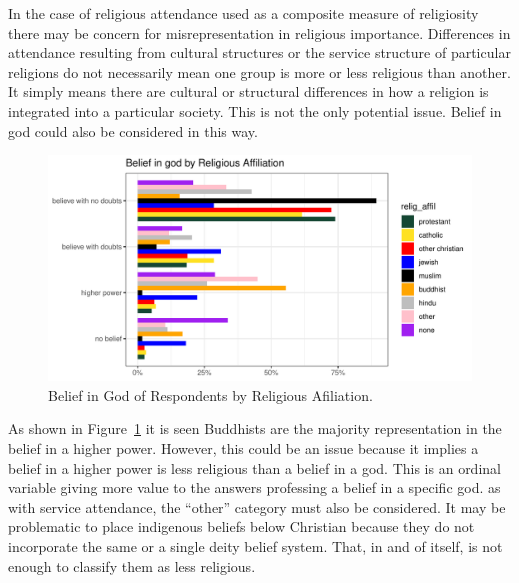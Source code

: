 \documentclass[
  12pt,
  letterpaper,
]{article}
\begin{document}
In the case of religious attendance used as a composite measure of
religiosity there may be concern for misrepresentation in religious
importance. Differences in attendance resulting from cultural structures
or the service structure of particular religions do not necessarily mean
one group is more or less religious than another. It simply means there
are cultural or structural differences in how a religion is integrated
into a particular society. This is not the only potential issue. Belief
in god could also be considered in this way.

\begin{figure}[!t]

{\centering \includegraphics{main_manuscript_files/figure-pdf/fig-Beleif_in_God_by_Religious_Affiliation-1.pdf}

}

\caption{\label{fig-Beleif_in_God_by_Religious_Affiliation}Belief in God
of Respondents by Religious Afiliation.}

\end{figure}

As shown in Figure~\ref{fig-Beleif_in_God_by_Religious_Affiliation} it
is seen Buddhists are the majority representation in the belief in a
higher power. However, this could be an issue because it implies a
belief in a higher power is less religious than a belief in a god. This
is an ordinal variable giving more value to the answers professing a
belief in a specific god. as with service attendance, the ``other''
category must also be considered. It may be problematic to place
indigenous beliefs below Christian because they do not incorporate the
same or a single deity belief system. That, in and of itself, is not
enough to classify them as less religious.
\end{document}
